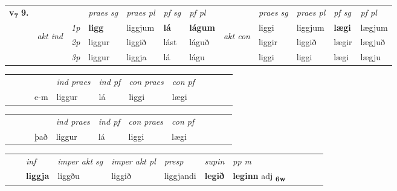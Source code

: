 \begin{tabular}{llllllllllll} \toprule
\multirow{4}{*}{{{\textbf{v{\textsubscript{7}}} \Large{\textbf{9.}}}}}  & &   &  \textit{praes sg}  & \textit{praes pl}  &\textit{ pf sg} & \textit{pf pl} &  &  \textit{praes sg}  & \textit{praes pl}  & \textit{pf sg} & \textit{pf pl } \\*
	\cmidrule{4-7} \cmidrule{9-12}
 & \multirow{3}{*}{\begin{turn}{90}\textit{akt ind}\end{turn}} & {\textit{1p}} & \textbf{ligg} & liggjum    & \textbf{lá} & \textbf{lágum} & \multirow{3}{*}{\begin{turn}{90}\textit{akt con}\end{turn}} &liggi & liggjum & \textbf{lægi} & lægjum\\*
& &  {\textit{2p}} &  liggur  & liggið   & lást & láguð & & liggir & liggið & lægir & lægjuð \\*
& &  {\textit{3p}} & liggur & liggja   & lá & lágu & & liggi & liggi& lægi & lægju  \\*
\cmidrule{4-7} \cmidrule{9-12}
\end{tabular}


\begin{tabular}{llllllllllll}
 & &  & &  \textit{ind praes} & \textit{ind pf} & \textit{con praes} & \textit{con pf} \\*
&  & & e-m & liggur & lá & liggi & lægi \\*
\cmidrule{5-9}
\end{tabular}


\begin{tabular}{llllllllllll}
 & &  & &  \textit{ind praes} & \textit{ind pf} & \textit{con praes} & \textit{con pf} \\*
&  & & það & liggur & lá & liggi & lægi \\*
\cmidrule{5-9}
\end{tabular}


\begin{tabular}{llllllllllll}
 & & \textit{inf} & \textit{imper akt sg} & \textit{imper akt pl}   & \textit{presp} & \textit{supin}  & \textit{pp m}     \\*
  & & \textbf{liggja} & liggðu  & liggið   & liggjandi &  \textbf{legið}  & \textbf{leginn} adj \textbf{\textsubscript{6w}} \\*
\cmidrule{1-12}
\end{tabular}




